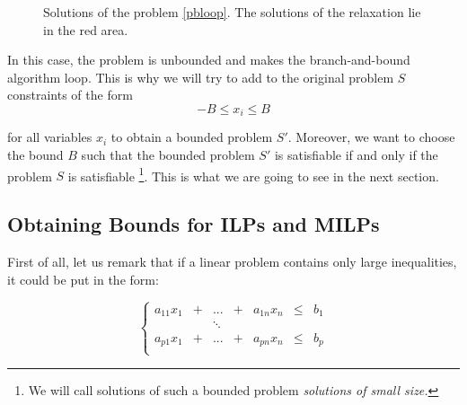 \documentclass{article}
\begin{document}
\begin{figure}[h]
  \centering


  \label{bbloop}
  \caption{Solutions of the problem
           \ref{pbloop}. The solutions of the relaxation lie in the red area.}
\end{figure}

In this case, the problem is unbounded and makes the branch-and-bound algorithm
loop. This is why we will try to add to the original problem $S$ constraints of
the form $$-B \leqslant x_i \leqslant B$$

for all variables $x_i$ to obtain a bounded problem $S'$.
Moreover, we want to choose the bound $B$ such that
the bounded problem $S'$ is satisfiable if and only if the problem $S$
is satisfiable \footnote{We will call solutions of such a bounded
problem \textit{solutions of small size.}}. 
This is what we are going to see in the next section.

\subsection{Obtaining Bounds for ILPs and MILPs}
\label{schrijverbnd}
First of all, let us remark that if a linear problem contains only 
large inequalities, it could be put in the form:

\begin{displaymath}
  \left\{
  \begin{array}{ccccccl}
    a_{11} x_1 & + & ...    & + & a_{1n} x_n & \leqslant & b_1 \\
               &   & \ddots &   &            &           &     \\
    a_{p1} x_1 & + & ...    & + & a_{pn} x_n & \leqslant & b_p \\
  \end{array}
  \right.
\end{displaymath}
\end{document}
